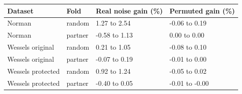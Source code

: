\begin{tabular}{llll}
\toprule
Dataset & Fold & Real noise gain (\%) & Permuted gain (\%) \\
\midrule
Norman & random & 1.27 to 2.54 & -0.06 to 0.19 \\
Norman & partner & -0.58 to 1.13 & 0.00 to 0.00 \\
Wessels original & random & 0.21 to 1.05 & -0.08 to 0.10 \\
Wessels original & partner & -0.07 to 0.19 & -0.01 to 0.00 \\
Wessels protected & random & 0.92 to 1.24 & -0.05 to 0.02 \\
Wessels protected & partner & -0.40 to 0.05 & -0.01 to -0.00 \\
\bottomrule
\end{tabular}
